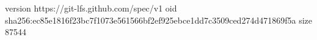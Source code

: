 version https://git-lfs.github.com/spec/v1
oid sha256:ec85e1816f23bc7f1073e561566bf2ef925ebce1dd7c3509ced274d471869f5a
size 87544
